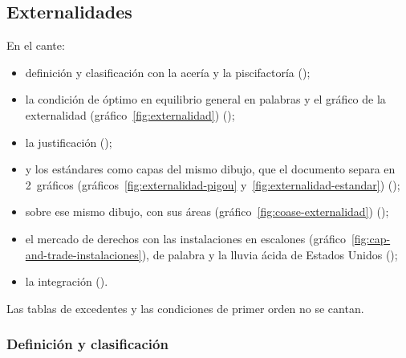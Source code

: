 \documentclass[11pt]{article}
\begin{document}
\subsection{Externalidades}\label{sec:externalidades}

\begin{notaopositor}
En el cante:
\begin{itemize}
\item definición y clasificación con la acería y la piscifactoría ();
\item la condición de óptimo en equilibrio general en palabras y el gráfico de la externalidad (gráfico~\ref{fig:externalidad}) ();
\item la justificación ();
\item {} y los estándares como capas del mismo dibujo, que el documento separa en 2~gráficos (gráficos~\ref{fig:externalidad-pigou} y~\ref{fig:externalidad-estandar}) ();
\item {} sobre ese mismo dibujo, con sus áreas (gráfico~\ref{fig:coase-externalidad}) ();
\item el mercado de derechos con las instalaciones en escalones (gráfico~\ref{fig:cap-and-trade-instalaciones}),  de palabra y la lluvia ácida de Estados Unidos ();
\item la integración ().
\end{itemize}
Las tablas de excedentes y las condiciones de primer orden no se cantan.
\end{notaopositor}

\subsubsection{Definición y clasificación}\label{sec:externalidades-definicion}
\end{document}
